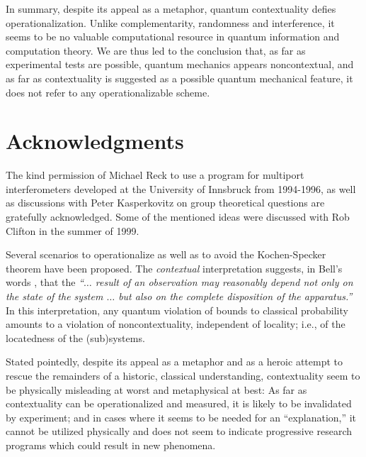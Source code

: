 In summary,
despite its appeal as a metaphor, quantum contextuality defies operationalization.
Unlike complementarity, randomness and interference,
it seems to be no valuable computational resource in quantum information and computation theory.
We are thus led to the conclusion that,
as far as experimental tests are possible, quantum mechanics appears noncontextual,
and as far as contextuality is suggested as a possible quantum mechanical feature,
it does not refer to any operationalizable scheme.

\section*{Acknowledgments}
The kind permission of Michael Reck to
use a program for multiport interferometers
developed at the University of Innsbruck from 1994-1996, as well as
discussions with Peter Kasperkovitz on group theoretical questions
are gratefully acknowledged.
Some of the mentioned ideas were discussed with Rob Clifton in the summer of 1999.




%
%






Several scenarios to operationalize
\cite{cabello-98,simon-2002,huang-2003} as well as to avoid
\cite{pitowsky-82,pitowsky-83,meyer:99}
the Kochen-Specker theorem have been proposed.
The {\it contextual} \cite{bell-66,hey-red,redhead} interpretation suggests,
in Bell's words \cite[Sect. 5]{bell-66}, that the {\em ``$\ldots$
result of an observation may reasonably depend
not only on the state of the system  $\ldots$
but also on the complete disposition  of the apparatus.''}
In this interpretation, any quantum violation of bounds to classical probability
amounts to a violation of noncontextuality,
independent of locality; i.e., of the locatedness of the (sub)systems.


Stated pointedly, despite its appeal as a metaphor
and as a heroic attempt
to rescue the remainders of a historic, classical understanding,
contextuality seem to be physically misleading at worst
and metaphysical at best:
As far as contextuality can be operationalized and measured,
it is likely to be invalidated by experiment;
and in cases where it seems to be needed for an ``explanation,''
it cannot be utilized physically and does not seem to indicate progressive
research programs which could result in new phenomena.

